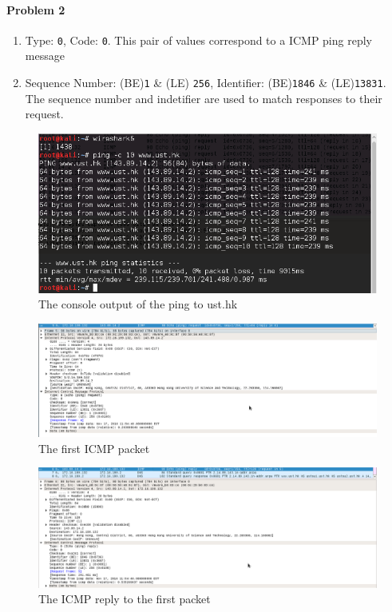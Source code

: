 \documentclass[12pt]{article}
\begin{document}
\paragraph{Problem 2}
\begin{enumerate}[label=\textbf{Part \alph*)}, leftmargin=*, align=left]
	\item Type: \texttt{0}, Code: \texttt{0}. This pair of values correspond to a ICMP ping reply message
	\item Sequence Number: (BE)\texttt{1} \& (LE) \texttt{256}, Identifier: (BE)\texttt{1846} \& (LE)\texttt{13831}. The sequence number and indetifier are used to match responses to their request.
\end{enumerate}

\begin{figure}[H]
	\caption{The console output of the ping to ust.hk}
	\centering
	\includegraphics[width=\textwidth,height=\textheight,keepaspectratio,scale=0.5=0.5]{ping}
\end{figure}

\begin{figure}[H]
	\caption{The first ICMP packet}
	\centering
	\includegraphics[width=\textwidth,height=\textheight,keepaspectratio,scale=0.5=0.5]{IMCP_pkt}
\end{figure}

\begin{figure}[H]
	\caption{The ICMP reply to the first packet}
	\centering
	\includegraphics[width=\textwidth,height=\textheight,keepaspectratio,scale=0.5=0.5]{ICMP_reply}
\end{figure}
\end{document}
